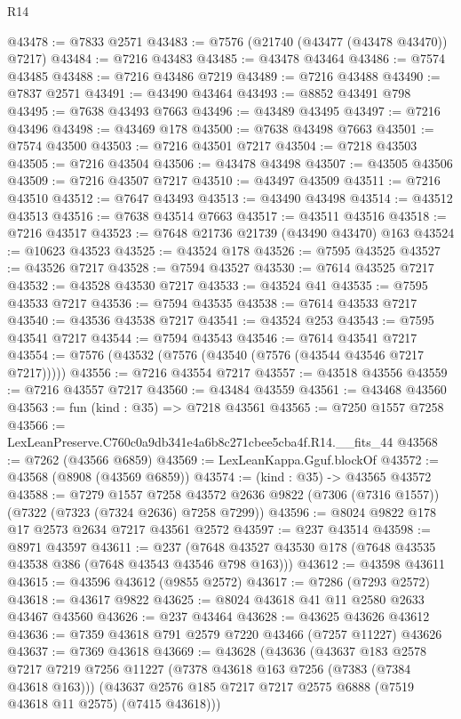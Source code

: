 \begin{lexlean}{R14}
\begin{coremodule}
@43478 := @7833 @2571
@43483 := @7576 (@21740 (@43477 (@43478 @43470)) @7217)
@43484 := @7216 @43483
@43485 := @43478 @43464
@43486 := @7574 @43485
@43488 := @7216 @43486 @7219
@43489 := @7216 @43488
@43490 := @7837 @2571
@43491 := @43490 @43464
@43493 := @8852 @43491 @798
@43495 := @7638 @43493 @7663
@43496 := @43489 @43495
@43497 := @7216 @43496
@43498 := @43469 @178
@43500 := @7638 @43498 @7663
@43501 := @7574 @43500
@43503 := @7216 @43501 @7217
@43504 := @7218 @43503
@43505 := @7216 @43504
@43506 := @43478 @43498
@43507 := @43505 @43506
@43509 := @7216 @43507 @7217
@43510 := @43497 @43509
@43511 := @7216 @43510
@43512 := @7647 @43493
@43513 := @43490 @43498
@43514 := @43512 @43513
@43516 := @7638 @43514 @7663
@43517 := @43511 @43516
@43518 := @7216 @43517
@43523 := @7648 @21736 @21739 (@43490 @43470) @163
@43524 := @10623 @43523
@43525 := @43524 @178
@43526 := @7595 @43525
@43527 := @43526 @7217
@43528 := @7594 @43527
@43530 := @7614 @43525 @7217
@43532 := @43528 @43530 @7217
@43533 := @43524 @41
@43535 := @7595 @43533 @7217
@43536 := @7594 @43535
@43538 := @7614 @43533 @7217
@43540 := @43536 @43538 @7217
@43541 := @43524 @253
@43543 := @7595 @43541 @7217
@43544 := @7594 @43543
@43546 := @7614 @43541 @7217
@43554 := @7576 (@43532 (@7576 (@43540 (@7576 (@43544 @43546 @7217 @7217)))))
@43556 := @7216 @43554 @7217
@43557 := @43518 @43556
@43559 := @7216 @43557 @7217
@43560 := @43484 @43559
@43561 := @43468 @43560
@43563 := fun (kind : @35) => @7218 @43561
@43565 := @7250 @1557 @7258
@43566 := LexLeanPreserve.C760c0a9db341e4a6b8c271cbee5cba4f.R14.__fits_44
@43568 := @7262 (@43566 @6859)
@43569 := LexLeanKappa.Gguf.blockOf
@43572 := @43568 (@8908 (@43569 @6859))
@43574 := (kind : @35) -> @43565 @43572
@43588 := @7279
    @1557
    @7258
    @43572
    @2636
    @9822
    (@7306 (@7316 @1557))
    (@7322 (@7323 (@7324 @2636) @7258 @7299))
@43596 := @8024 @9822 @178 @17 @2573 @2634 @7217 @43561 @2572
@43597 := @237 @43514
@43598 := @8971 @43597
@43611 := @237 (@7648 @43527 @43530 @178 (@7648 @43535 @43538 @386 (@7648 @43543 @43546 @798 @163)))
@43612 := @43598 @43611
@43615 := @43596 @43612 (@9855 @2572)
@43617 := @7286 (@7293 @2572)
@43618 := @43617 @9822
@43625 := @8024 @43618 @41 @11 @2580 @2633 @43467 @43560
@43626 := @237 @43464
@43628 := @43625 @43626 @43612
@43636 := @7359 @43618 @791 @2579 @7220 @43466 (@7257 @11227) @43626
@43637 := @7369 @43618
@43669 := @43628
    (@43636
      (@43637
        @183
        @2578
        @7217
        @7219
        @7256
        @11227
        (@7378 @43618 @163 @7256 (@7383 (@7384 @43618 @163)))
        (@43637 @2576 @185 @7217 @7217 @2575 @6888 (@7519 @43618 @11 @2575) (@7415 @43618)))

\end{coremodule}
\end{lexlean}
